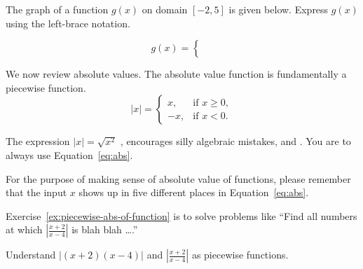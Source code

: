 \documentclass[../main.tex]{subfiles}
\begin{document}
\begin{exercise}
  The graph of a function \(g(x)\) on domain \([-2,5]\) is given below. Express \(g(x)\) using the left-brace notation.

  \begin{minipage}{3in}
  \end{minipage}
  \begin{minipage}{2in}
    \[
      g(x) = 
      \begin{cases}
        \phantom{a} \\[10ex]
        \phantom{a}
      \end{cases}
    \]
  \end{minipage}
\end{exercise}

\clearpage

We now review absolute values. The absolute value function is fundamentally a piecewise function.
\begin{equation} \label{eq:abs}
  |x| = 
  \begin{cases}
    x, &\text{if } x \ge 0, \\
    -x, &\text{if } x < 0.
  \end{cases}
\end{equation}

\faExclamationTriangle{} The expression \(|x| = \sqrt{x^{2}}\) , encourages silly algebraic mistakes, and .  You are  to always use Equation~\eqref{eq:abs}.  

For the purpose of making sense of absolute value of functions, please remember that the input \(x\) shows up in five different places in Equation~\eqref{eq:abs}.  


Exercise~\ref{ex:piecewise-abs-of-function} is  to solve problems like \enquote{Find all numbers at which \(\left| \frac{x + 2}{x - 4} \right|\) is blah blah \dots.}

\begin{exercise} \label{ex:piecewise-abs-of-function}
  Understand \(|(x + 2)(x - 4)|\) and \(\left| \frac{x + 2}{x - 4} \right|\) as piecewise functions.

\end{exercise}
\end{document}
